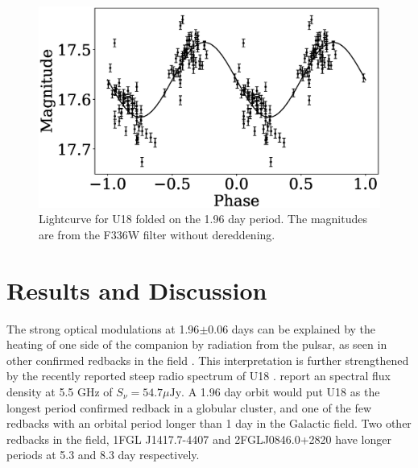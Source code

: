 \documentclass[fleqn,usenatbib,useAMS,letters]{mnras}
\begin{document}



 \begin{figure}
	\includegraphics[width =\columnwidth]{folded.eps}
	\vspace{-0.5 cm}
    \caption{Lightcurve for U18 folded on the 1.96 day period. The magnitudes are from the F336W filter without dereddening. }
    \label{fig:folded}
\end{figure}

 
 \section{Results and Discussion}
 

 
 The strong optical modulations at 1.96$\pm$0.06 days can be explained by the heating of one side of the companion by radiation from the pulsar, as seen in other confirmed redbacks in the field \citep[e.g.,][]{Hui2015PSR2219,salvetti2015J2039}.  This interpretation is further strengthened by the recently reported steep radio spectrum of U18 \citep{CoryPaper}. \citet{CoryPaper} report an spectral flux density at 5.5 GHz of $S_\nu =54.7 \mu\text{Jy}$. A 1.96 day orbit would put U18 as the longest period confirmed redback in a globular cluster, and one of the few redbacks with an orbital period longer than 1 day in the Galactic field. Two other redbacks in the field, 1FGL J1417.7-4407 \citep{Strader2015,Camilo2016,Swihart2018} and 2FGLJ0846.0+2820 \citep{Swihart2017} have longer periods at 5.3 and 8.3 day respectively. %
 
\end{document}
